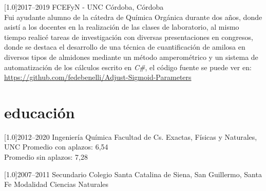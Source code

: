 \documentclass[espanol]{cv-style}     %
\begin{document}
\begin{entrylist}
\entry
  {\scalebox{.8}[1.0]{2017--2019}}
  {FCEFyN - UNC}
  {Córdoba, Córdoba}  {\\
	  Fui ayudante alumno de la cátedra de Química Orgánica durante dos años, donde asistí a los docentes en la realización de las clases de laboratorio, al mismo tiempo realicé tareas de investigación con diversas presentaciones en congresos, donde se destaca el desarrollo de una técnica de cuantificación de amilosa en diversos tipos de almidones mediante un método amperométrico y un sistema de automatización de los cálculos escrito en \textit{C\#}, el código fuente se puede ver en: 
	  \url{https://github.com/fedebenelli/Adjust-Sigmoid-Parameters} 
  }

\end{entrylist}

\newpage




\section{educación}
\begin{entrylist}

\entry
{\scalebox{.8}[1.0]{2012--2020}}
{Ingeniería Química}
{Facultad de Cs. Exactas, Físicas y Naturales, UNC}
{
\noindent Promedio con aplazos: 6,54\\
Promedio sin aplazos: 7,28\\
}

\entry
{\scalebox{.8}[1.0]{2007--2011}}
{Secundario}
{Colegio Santa Catalina de Siena, San Guillermo, Santa Fe}
{Modalidad Ciencias Naturales}

\end{entrylist}

\end{document}
